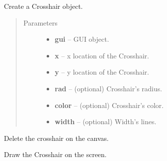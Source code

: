 \documentclass[letterpaper,10pt,english]{sphinxmanual}
\begin{document}

\begin{fulllineitems}
\label{api:graphic.Crosshair}
Create a Crosshair object.
\begin{quote}\begin{description}
\item[{Parameters}] \leavevmode\begin{itemize}
\item {} 
\textbf{gui} -- GUI object.

\item {} 
\textbf{x} -- x location of the Crosshair.

\item {} 
\textbf{y} -- y location of the Crosshair.

\item {} 
\textbf{rad} -- (optional) Crosshair's radius.

\item {} 
\textbf{color} -- (optional) Crosshair's color.

\item {} 
\textbf{width} -- (optional) Width's lines.

\end{itemize}

\end{description}\end{quote}

\begin{fulllineitems}
\label{api:graphic.Crosshair.delete}
Delete the crosshair on the canvas.

\end{fulllineitems}


\begin{fulllineitems}
\label{api:graphic.Crosshair.draw}
Draw the Crosshair on the screen.

\end{fulllineitems}


\end{fulllineitems}

\end{document}
